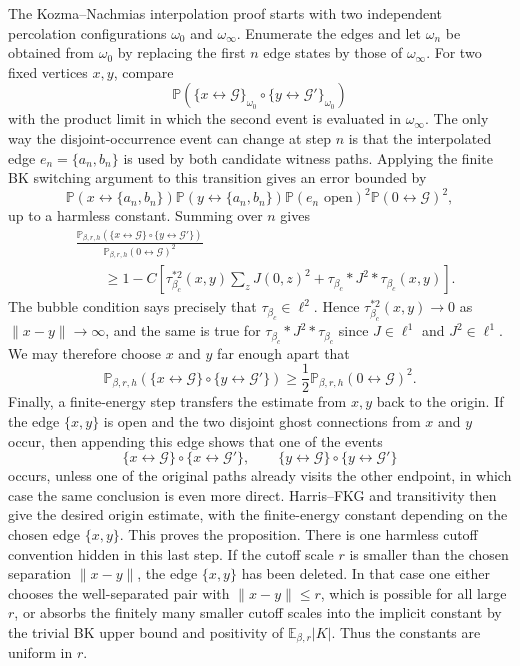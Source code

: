 \documentclass[11pt,reqno]{book}
\numberwithin{equation}{chapter}
\theoremstyle{plain}
\theoremstyle{definition}
\theoremstyle{remark}
\renewcommand{\P}{\mathbb P}
\newcommand{\E}{\mathbb E}
\newcommand{\1}{\mathbf 1}
\newcommand{\norm}[1]{\lVert #1\rVert}
\begin{document}
The Kozma--Nachmias interpolation proof starts with two independent
percolation configurations \(\omega_0\) and \(\omega_\infty\). Enumerate the
edges and let \(\omega_n\) be obtained from \(\omega_0\) by replacing the
first \(n\) edge states by those of \(\omega_\infty\). For two fixed vertices
\(x,y\), compare
\[
  \P(\{x\leftrightarrow\mathcal G\}_{\omega_0}
  \circ
  \{y\leftrightarrow\mathcal G'\}_{\omega_0})
\]
with the product limit in which the second event is evaluated in
\(\omega_\infty\). The only way the disjoint-occurrence event can change at
step \(n\) is that the interpolated edge \(e_n=\{a_n,b_n\}\) is used by both
candidate witness paths. Applying the finite BK switching argument to this
transition gives an error bounded by
\[
  \P(x\leftrightarrow \{a_n,b_n\})
  \P(y\leftrightarrow \{a_n,b_n\})
  \P(e_n\text{ open})^2
  \P(0\leftrightarrow\mathcal G)^2,
\]
up to a harmless constant. Summing over \(n\) gives
\[
\begin{aligned}
&\frac{
  \P_{\beta,r,h}(\{x\leftrightarrow\mathcal G\}
  \circ
  \{y\leftrightarrow\mathcal G'\})
}{
  \P_{\beta,r,h}(0\leftrightarrow\mathcal G)^2
}
\\
&\qquad\geq
1-C\left[
  \tau_{\beta_c}^{*2}(x,y)\sum_z J(0,z)^2
  +
  \tau_{\beta_c}*J^2*\tau_{\beta_c}(x,y)
\right].
\end{aligned}
\]
The bubble condition says precisely that \(\tau_{\beta_c}\in\ell^2\). Hence
\(\tau_{\beta_c}^{*2}(x,y)\to0\) as \(\norm{x-y}\to\infty\), and the same is
true for \(\tau_{\beta_c}*J^2*\tau_{\beta_c}\) since \(J\in\ell^1\) and
\(J^2\in\ell^1\). We may therefore choose \(x\) and \(y\) far enough apart
that
\[
  \P_{\beta,r,h}(\{x\leftrightarrow\mathcal G\}
  \circ
  \{y\leftrightarrow\mathcal G'\})
  \geq
  \frac12\P_{\beta,r,h}(0\leftrightarrow\mathcal G)^2 .
\]
Finally, a finite-energy step transfers the estimate from \(x,y\) back to
the origin. If the edge \(\{x,y\}\) is open and the two disjoint ghost
connections from \(x\) and \(y\) occur, then appending this edge shows that
one of the events
\[
  \{x\leftrightarrow\mathcal G\}\circ
  \{x\leftrightarrow\mathcal G'\},
  \qquad
  \{y\leftrightarrow\mathcal G\}\circ
  \{y\leftrightarrow\mathcal G'\}
\]
occurs, unless one of the original paths already visits the other endpoint,
in which case the same conclusion is even more direct. Harris--FKG and
transitivity then give the desired origin estimate, with the finite-energy
constant depending on the chosen edge \(\{x,y\}\). This proves the
proposition.
There is one harmless cutoff convention hidden in this last step. If the
cutoff scale \(r\) is smaller than the chosen separation \(\norm{x-y}\), the
edge \(\{x,y\}\) has been deleted. In that case one either chooses the
well-separated pair with \(\norm{x-y}\leq r\), which is possible for all
large \(r\), or absorbs the finitely many smaller cutoff scales into the
implicit constant by the trivial BK upper bound and positivity of
\(\E_{\beta,r}|K|\). Thus the constants are uniform in \(r\).
\end{document}
